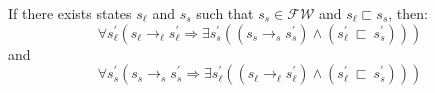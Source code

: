 \begin{lemma}
\label{lem:write}
If there exists states $s_\ell$ and $s_s$ such that $s_s \in \mathcal{FW}$ and $s_\ell \sqsubset s_s$, then:
\begin{equation}
\forall s_\ell^\prime ( s_\ell \rightarrow_\ell s_\ell^\prime \Rightarrow \exists s_s^\prime( (s_s \rightarrow_s s_s^\prime )\wedge (s_\ell^\prime\ \sqsubset\ s_s^\prime ))  )
\end{equation}
and
\begin{equation}
\forall s_s^\prime ( s_s \rightarrow_s s_s^\prime\Rightarrow \exists s_\ell^\prime( (s_\ell \rightarrow_\ell s_\ell^\prime )\wedge (s_\ell^\prime\ \sqsubset\ s_s^\prime ))  )
\end{equation}
\end{lemma}
